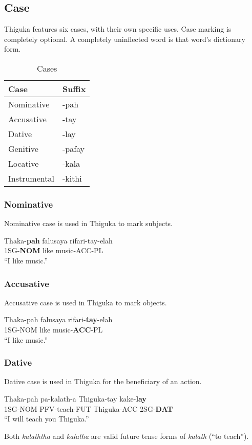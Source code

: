 \newpage{}

\subsection{Case}
Thiguka features six cases, with their own specific uses.
Case marking is completely optional.
A completely uninflected word is that word's dictionary form.

\begin{table}[h!]
    \centering
    \caption{Cases}
    \begin{tabularx}{8cm}{|X|X|}
        \hline
        \textbf{Case} & \textbf{Suffix} \\
        \hline
        Nominative & -pah \\
        Accusative & -tay \\
        Dative & -lay \\
        Genitive & -pafay \\
        Locative & -kala \\
        Instrumental & -kithi \\ 
        \hline
    \end{tabularx}
\end{table}

\subsubsection{Nominative}
Nominative case is used in Thiguka to mark subjects.
\begin{exe}
    \ex{} \gll{}Thaka-\textbf{pah} falusaya rifari-tay-elah\\
                1SG-\textbf{NOM}   like     music-ACC-PL\\
        \glt{}``I like music.''
\end{exe}

\subsubsection{Accusative}
Accusative case is used in Thiguka to mark objects.
\begin{exe}
    \ex{} \gll{}Thaka-pah falusaya rifari-\textbf{tay}-elah\\
                1SG-NOM            like     music-\textbf{ACC}-PL\\
        \glt{}``I like music.''
\end{exe}

\subsubsection{Dative}
Dative case is used in Thiguka for the beneficiary of an action.
\begin{exe}
    \ex{} \gll{}Thaka-pah pa-kalath-a   Thiguka-tay kake-\textbf{lay}\\
                1SG-NOM   PFV-teach-FUT Thiguka-ACC 2SG-\textbf{DAT}\\
        \glt{}``I will teach you Thiguka.''
\end{exe}
Both \textit{kalaththa} and \textit{kalatha} are valid future tense forms of \textit{kalath} (``to teach'').

